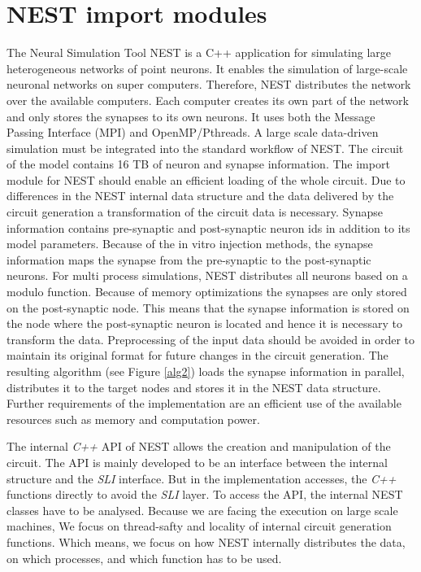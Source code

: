 \section{NEST import modules}
The Neural Simulation Tool NEST \cite{gewaltig2007nest} is a C++ application for simulating large heterogeneous networks of point neurons. It enables the simulation of large-scale neuronal networks on super computers. Therefore, NEST distributes the network over the available computers. Each computer creates its own part of the network and only stores the synapses to its own neurons.
It uses both the Message Passing Interface (MPI) and OpenMP/Pthreads.
A large scale data-driven simulation must be integrated into the standard
workflow of NEST.
The circuit of the model contains 16 TB of neuron and synapse information.
The import module for NEST should enable an efficient loading of the whole circuit.
Due to differences in the NEST internal data structure and the data delivered by the
circuit generation a transformation of the circuit data is necessary.
Synapse information contains pre-synaptic and post-synaptic
neuron ids in addition to its model parameters.
Because of the in vitro injection
methods, the synapse information maps the synapse from the pre-synaptic to the
post-synaptic neurons. For multi process simulations, NEST distributes all neurons
based on a modulo function.
Because of memory optimizations
the synapses are only stored on the post-synaptic node. This means that the
synapse information is stored on the node where the post-synaptic neuron
is located and hence it is necessary to transform the data.
Preprocessing of the
input data should be avoided in order to maintain its original format for future changes in the circuit generation.
The resulting algorithm (see Figure \ref{alg2}) loads the synapse information in parallel, distributes it to the target nodes and stores it in the
NEST data structure.
Further requirements of the implementation are an efficient use of the available resources such as
memory and computation power.

The internal \emph{C++} API of NEST allows the creation and manipulation of the circuit.
The API is mainly developed to be an interface between the internal structure
and the \emph{SLI} interface. But in the implementation accesses, the \emph{C++} functions directly
to avoid the \emph{SLI} layer. To access the API, the internal NEST classes
have to be analysed. Because we are facing the execution on large scale machines,
We focus on thread-safty and locality of internal circuit generation functions.
Which means, we focus on how NEST internally distributes the data, on which processes, and which
function has to be used.


